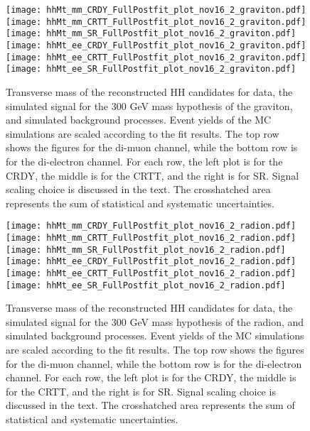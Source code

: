 \begin{small}
\begin{figure}[H]
  \begin{center}
    \texttt{[image: hhMt\_mm\_CRDY\_FullPostfit\_plot\_nov16\_2\_graviton.pdf]}
    \texttt{[image: hhMt\_mm\_CRTT\_FullPostfit\_plot\_nov16\_2\_graviton.pdf]}
    \texttt{[image: hhMt\_mm\_SR\_FullPostfit\_plot\_nov16\_2\_graviton.pdf]} \\
    \texttt{[image: hhMt\_ee\_CRDY\_FullPostfit\_plot\_nov16\_2\_graviton.pdf]}
    \texttt{[image: hhMt\_ee\_CRTT\_FullPostfit\_plot\_nov16\_2\_graviton.pdf]}
    \texttt{[image: hhMt\_ee\_SR\_FullPostfit\_plot\_nov16\_2\_graviton.pdf]}
    \caption[Transverse mass of the reconstructed HH candidates for graviton hypothesis.]{Transverse mass of the reconstructed HH candidates for data, the simulated signal for the 300 GeV mass hypothesis of the graviton, and simulated background processes. Event yields of the MC simulations are scaled according to the fit results. The top row shows the figures for the di-muon channel, while the bottom row is for the di-electron channel. For each row, the left plot is for the CRDY, the middle is for the CRTT, and the right is for SR. Signal scaling choice is discussed in the text. The crosshatched area represents the sum of statistical and systematic uncertainties.}
    \label{fig:MCcomparisons}                                                                         
  \end{center}
\end{figure}

\begin{figure}[H]
  \begin{center}
    \texttt{[image: hhMt\_mm\_CRDY\_FullPostfit\_plot\_nov16\_2\_radion.pdf]}
    \texttt{[image: hhMt\_mm\_CRTT\_FullPostfit\_plot\_nov16\_2\_radion.pdf]}
    \texttt{[image: hhMt\_mm\_SR\_FullPostfit\_plot\_nov16\_2\_radion.pdf]} \\
    \texttt{[image: hhMt\_ee\_CRDY\_FullPostfit\_plot\_nov16\_2\_radion.pdf]}
    \texttt{[image: hhMt\_ee\_CRTT\_FullPostfit\_plot\_nov16\_2\_radion.pdf]}
    \texttt{[image: hhMt\_ee\_SR\_FullPostfit\_plot\_nov16\_2\_radion.pdf]}
    \caption[Transverse mass of the reconstructed HH candidates for graviton hypothesis.]{Transverse mass of the reconstructed HH candidates for data, the simulated signal for the 300 GeV mass hypothesis of the radion, and simulated background processes. Event yields of the MC simulations are scaled according to the fit results. The top row shows the figures for the di-muon channel, while the bottom row is for the di-electron channel. For each row, the left plot is for the CRDY, the middle is for the CRTT, and the right is for SR. Signal scaling choice is discussed in the text. The crosshatched area represents the sum of statistical and systematic uncertainties.}
    \label{fig:MCcomparisons_radion}                                                                            
  \end{center}
\end{figure}


\end{small}
